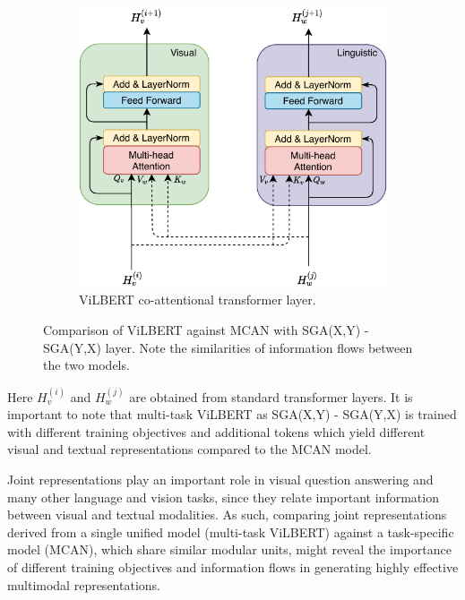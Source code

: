 \documentclass{article}
\begin{document}
\begin{figure}[ht]
\begin{subfigure}[b]{\textwidth}
	\includegraphics[scale=0.7]{vilbert_coattention}
	\caption{ViLBERT co-attentional transformer layer.}
	\end{subfigure}
\caption{Comparison of ViLBERT against MCAN with SGA(X,Y) - SGA(Y,X) layer. Note the similarities of information flows between the two models.}
\label{fig:vilbert_coattention}
\end{figure}

Here $H_{v}^{(i)}$ and $H_{w}^{(j)}$ are obtained from standard transformer layers. It is important to note that multi-task ViLBERT as SGA(X,Y) - SGA(Y,X) is trained with different training objectives and additional tokens which yield different visual and textual representations compared to the MCAN model. 

Joint representations play an important role in visual question answering and many other language and vision tasks, since they relate important information between visual and textual modalities. As such, comparing joint representations derived from a single unified model (multi-task ViLBERT) against a task-specific model (MCAN), which share similar modular units, might reveal the importance of different training objectives and information flows in generating highly effective multimodal representations.

\end{document}

